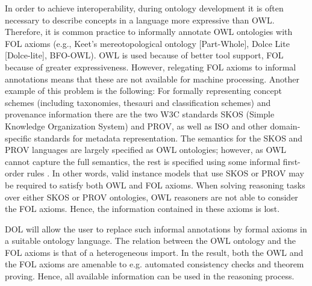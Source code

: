 \documentclass[10pt,%
\ifpretendfinal
final%
\else
draft%
\fi,
]{scrreprt}
\begin{document}
In order to achieve interoperability, during ontology development it is often necessary to describe concepts in a language more expressive than OWL. 
Therefore, it is common practice to informally annotate OWL ontologies with FOL axioms (e.g., Keet's mereotopological ontology [Part-Whole], 
Dolce Lite [Dolce-lite], BFO-OWL). OWL is used because of better tool support, FOL because of greater expressiveness. However, relegating FOL axioms to 
informal annotations means that these are not available for machine processing. 
Another example of this problem is the following: For formally representing concept schemes (including taxonomies, thesauri and classification schemes) and 
provenance information there are the two W3C standards SKOS (Simple Knowledge Organization System) and PROV, as well as ISO and other domain-specific 
standards for metadata representation. The semantics for the SKOS and PROV languages are largely specified as OWL ontologies; however, as OWL cannot 
capture the full semantics, the rest is specified using some informal first-order rules . In other words, valid instance models that use SKOS or PROV may be 
required to satisfy both OWL and FOL axioms. When solving reasoning tasks over either SKOS or PROV ontologies, OWL reasoners are not able to consider the 
FOL axioms. Hence, the information contained in these axioms is lost.

DOL will allow the user to replace such informal annotations by formal axioms in a suitable ontology language. The relation between the 
OWL ontology and the FOL axioms is that of a heterogeneous import. In the result, both the OWL and the FOL axioms are amenable to e.g. automated consistency 
checks and theorem proving. Hence, all available information can be used in the reasoning process.
\end{document}
